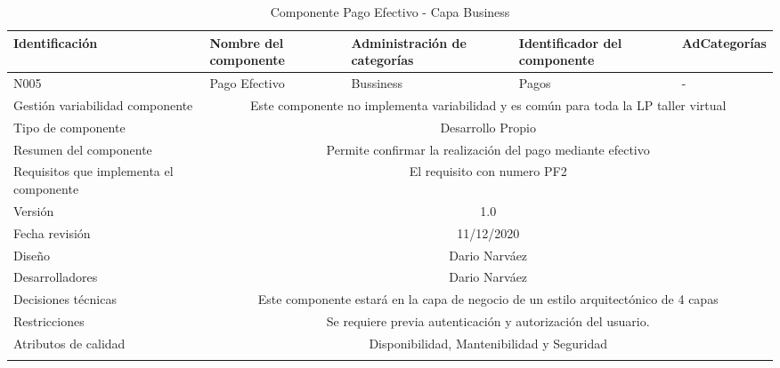 \documentclass[10pt,a4paper,openany]{book}
\begin{document}
\begin{longtable}{|p{3cm}|p{3cm}|p{3cm}|p{3cm}|p{3cm}|} \hline
Identificación & Nombre del componente & Administración de categorías & Identificador del componente & AdCategorías \\[0.5ex] \hline
N005& Pago Efectivo& Bussiness& Pagos& -\\[0.5ex] \hline
Gestión variabilidad componente & \multicolumn{4}{|c|}{{Este componente no implementa variabilidad y es común para toda la LP taller virtual}} \\ \hline
Tipo de componente & \multicolumn{4}{|c|}{Desarrollo Propio} \\ \hline
Resumen del componente & \multicolumn{4}{|c|}{Permite confirmar la realización del pago mediante efectivo} \\ \hline
Requisitos que implementa el componente & \multicolumn{4}{|c|}{El requisito con numero PF2 } \\ \hline
Versión & \multicolumn{4}{|c|}{1.0 } \\ \hline
Fecha revisión & \multicolumn{4}{|c|}{ 11/12/2020} \\ \hline
Diseño & \multicolumn{4}{|c|}{Dario Narváez} \\ \hline
Desarrolladores & \multicolumn{4}{|c|}{Dario Narváez} \\ \hline
Decisiones técnicas & \multicolumn{4}{|c|}{Este componente estará en la capa de negocio de un estilo arquitectónico de 4 capas  } \\ \hline
Restricciones & \multicolumn{4}{|c|}{Se requiere previa autenticación y autorización del usuario.} \\ \hline
Atributos de calidad & \multicolumn{4}{|c|}{Disponibilidad, Mantenibilidad y Seguridad} \\ \hline
\caption{Componente Pago Efectivo - Capa Business}
\label{table:t6}
\end{longtable}
\end{document}
